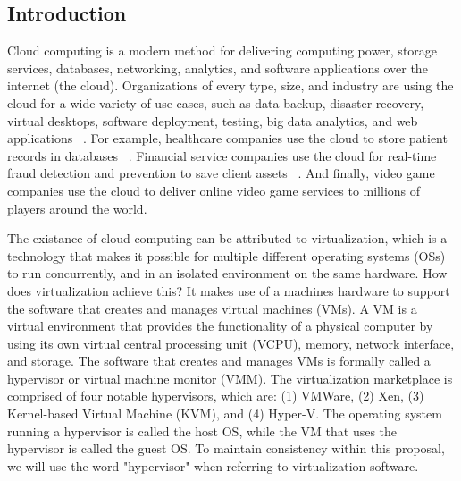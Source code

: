 \documentclass{report}
\begin{document}
\begin{spacing}{1.5}


\newpage
\chapter{Introduction}

{\large
Cloud computing is a modern method for delivering computing power, storage services, databases, networking, analytics, and software applications over the internet (the cloud). Organizations of every type, size, and industry are using the cloud for a wide variety of use cases, such as data backup, disaster recovery, virtual desktops, software deployment, testing, big data analytics, and web applications ~\cite{BELLO2021103441}. For example, healthcare companies use the cloud to store patient records in databases ~\cite{BELLO2021103441}. Financial service companies use the cloud for real-time fraud detection and prevention to save client assets ~\cite{BELLO2021103441}. And finally, video game companies use the cloud to deliver online video game services to millions of players around the world.
\newline
}

{\large
\noindent The existance of cloud computing can be attributed to virtualization, which is a technology that makes it possible for multiple different operating systems (OSs) to run concurrently, and in an isolated environment on the same hardware. How does virtualization achieve this? It makes use of a machines hardware to support the software that creates and manages virtual machines (VMs). A VM is a virtual environment that provides the functionality of a physical computer by using its own virtual central processing unit (VCPU), memory, network interface, and storage. The software that creates and manages VMs is formally called a hypervisor or virtual machine monitor (VMM). The virtualization marketplace is comprised of four notable hypervisors, which are: (1) VMWare, (2) Xen, (3) Kernel-based Virtual Machine (KVM), and (4) Hyper-V. The operating system running a hypervisor is called the host OS, while the VM that uses the hypervisor is called the guest OS. To maintain consistency within this proposal, we will use the word "hypervisor" when referring to virtualization software.
\newline
}


\end{spacing}
\end{document}
